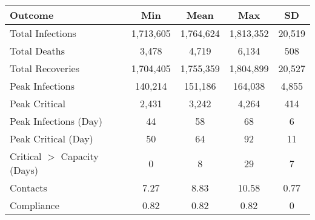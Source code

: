 \begin{table}[ht]
\centering
\begin{tabular}{lcccc}
  \hline
Outcome & Min & Mean & Max & SD \\ 
  \hline
Total Infections & 1,713,605 & 1,764,624 & 1,813,352 & 20,519 \\ 
  Total Deaths &     3,478 &     4,719 &     6,134 &    508 \\ 
  Total Recoveries & 1,704,405 & 1,755,359 & 1,804,899 & 20,527 \\ 
  Peak Infections &   140,214 &   151,186 &   164,038 &  4,855 \\ 
  Peak Critical &     2,431 &     3,242 &     4,264 &    414 \\ 
  Peak Infections (Day) & 44 & 58 & 68 & 6 \\ 
  Peak Critical (Day) & 50 & 64 & 92 & 11 \\ 
  Critical $>$ Capacity (Days) & 0 & 8 & 29 & 7 \\ 
  Contacts & 7.27 & 8.83 & 10.58 & 0.77 \\ 
  Compliance & 0.82 & 0.82 & 0.82 & 0 \\ 
   \hline
\end{tabular}
\end{table}
